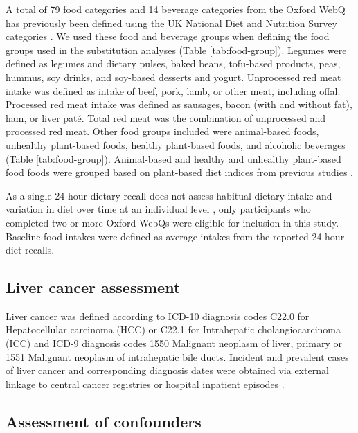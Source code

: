 \documentclass[
]{article}
\begin{document}
A total of 79 food categories and 14 beverage categories from the Oxford
WebQ has previously been defined using the UK National Diet and
Nutrition Survey categories \autocite{piernas2021}. We used these food and
beverage groups when defining the food groups used in the substitution
analyses (Table \ref{tab:food-group}). Legumes were defined as legumes
and dietary pulses, baked beans, tofu-based products, peas, hummus, soy
drinks, and soy-based desserts and yogurt. Unprocessed red meat intake
was defined as intake of beef, pork, lamb, or other meat, including
offal. Processed red meat intake was defined as sausages, bacon (with
and without fat), ham, or liver paté. Total red meat was the combination
of unprocessed and processed red meat. Other food groups included were
animal-based foods, unhealthy plant-based foods, healthy plant-based
foods, and alcoholic beverages (Table \ref{tab:food-group}).
Animal-based and healthy and unhealthy plant-based food foods were
grouped based on plant-based diet indices from previous studies
\autocite{Thompson2023,Heianza2021,Satija2017,Satija2016}.

As a single 24-hour dietary recall does not assess habitual dietary
intake and variation in diet over time at an individual level
\autocite{thompson2013,gurinovic2017}, only participants who completed two or
more Oxford WebQs were eligible for inclusion in this study. Baseline
food intakes were defined as average intakes from the reported 24-hour
diet recalls.

\hypertarget{subsec3}{%
\subsection{Liver cancer assessment}\label{subsec3}}

Liver cancer was defined according to ICD-10 diagnosis codes C22.0 for
Hepatocellular carcinoma (HCC) or C22.1 for Intrahepatic
cholangiocarcinoma (ICC) and ICD-9 diagnosis codes 1550 Malignant
neoplasm of liver, primary or 1551 Malignant neoplasm of intrahepatic
bile ducts. Incident and prevalent cases of liver cancer and
corresponding diagnosis dates were obtained via external linkage to
central cancer registries or hospital inpatient episodes \autocite{RN112,RN114}.

\hypertarget{subsec4}{%
\subsection{Assessment of confounders}\label{subsec4}}
\end{document}
